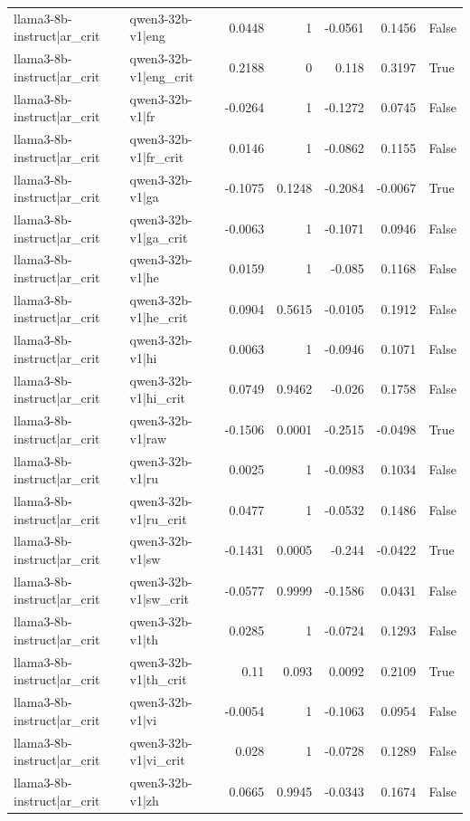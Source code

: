 \begin{table}
\begin{tabular}{l l r r r r l}
llama3-8b-instruct|ar_crit & qwen3-32b-v1|eng & 0.0448 & 1 & -0.0561 & 0.1456 & False \\
llama3-8b-instruct|ar_crit & qwen3-32b-v1|eng_crit & 0.2188 & 0 & 0.118 & 0.3197 & True \\
llama3-8b-instruct|ar_crit & qwen3-32b-v1|fr & -0.0264 & 1 & -0.1272 & 0.0745 & False \\
llama3-8b-instruct|ar_crit & qwen3-32b-v1|fr_crit & 0.0146 & 1 & -0.0862 & 0.1155 & False \\
llama3-8b-instruct|ar_crit & qwen3-32b-v1|ga & -0.1075 & 0.1248 & -0.2084 & -0.0067 & True \\
llama3-8b-instruct|ar_crit & qwen3-32b-v1|ga_crit & -0.0063 & 1 & -0.1071 & 0.0946 & False \\
llama3-8b-instruct|ar_crit & qwen3-32b-v1|he & 0.0159 & 1 & -0.085 & 0.1168 & False \\
llama3-8b-instruct|ar_crit & qwen3-32b-v1|he_crit & 0.0904 & 0.5615 & -0.0105 & 0.1912 & False \\
llama3-8b-instruct|ar_crit & qwen3-32b-v1|hi & 0.0063 & 1 & -0.0946 & 0.1071 & False \\
llama3-8b-instruct|ar_crit & qwen3-32b-v1|hi_crit & 0.0749 & 0.9462 & -0.026 & 0.1758 & False \\
llama3-8b-instruct|ar_crit & qwen3-32b-v1|raw & -0.1506 & 0.0001 & -0.2515 & -0.0498 & True \\
llama3-8b-instruct|ar_crit & qwen3-32b-v1|ru & 0.0025 & 1 & -0.0983 & 0.1034 & False \\
llama3-8b-instruct|ar_crit & qwen3-32b-v1|ru_crit & 0.0477 & 1 & -0.0532 & 0.1486 & False \\
llama3-8b-instruct|ar_crit & qwen3-32b-v1|sw & -0.1431 & 0.0005 & -0.244 & -0.0422 & True \\
llama3-8b-instruct|ar_crit & qwen3-32b-v1|sw_crit & -0.0577 & 0.9999 & -0.1586 & 0.0431 & False \\
llama3-8b-instruct|ar_crit & qwen3-32b-v1|th & 0.0285 & 1 & -0.0724 & 0.1293 & False \\
llama3-8b-instruct|ar_crit & qwen3-32b-v1|th_crit & 0.11 & 0.093 & 0.0092 & 0.2109 & True \\
llama3-8b-instruct|ar_crit & qwen3-32b-v1|vi & -0.0054 & 1 & -0.1063 & 0.0954 & False \\
llama3-8b-instruct|ar_crit & qwen3-32b-v1|vi_crit & 0.028 & 1 & -0.0728 & 0.1289 & False \\
llama3-8b-instruct|ar_crit & qwen3-32b-v1|zh & 0.0665 & 0.9945 & -0.0343 & 0.1674 & False \\

\end{tabular}
\end{table}
